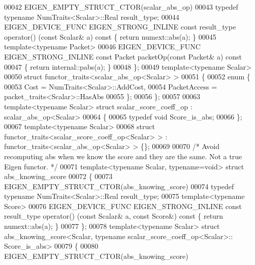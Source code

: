 \begin{DoxyCode}
00042   EIGEN\_EMPTY\_STRUCT\_CTOR(scalar\_abs\_op)
00043   \textcolor{keyword}{typedef} \textcolor{keyword}{typename} NumTraits<Scalar>::Real result\_type;
00044   EIGEN\_DEVICE\_FUNC EIGEN\_STRONG\_INLINE \textcolor{keyword}{const} result\_type operator() (\textcolor{keyword}{const} Scalar& a)\textcolor{keyword}{ const }\{ \textcolor{keywordflow}{return} 
      numext::abs(a); \}
00045   \textcolor{keyword}{template}<\textcolor{keyword}{typename} Packet>
00046   EIGEN\_DEVICE\_FUNC EIGEN\_STRONG\_INLINE \textcolor{keyword}{const} Packet packetOp(\textcolor{keyword}{const} Packet& a)\textcolor{keyword}{ const}
00047 \textcolor{keyword}{  }\{ \textcolor{keywordflow}{return} internal::pabs(a); \}
00048 \};
00049 \textcolor{keyword}{template}<\textcolor{keyword}{typename} Scalar>
00050 \textcolor{keyword}{struct }functor\_traits<scalar\_abs\_op<Scalar> >
00051 \{
00052   \textcolor{keyword}{enum} \{
00053     Cost = NumTraits<Scalar>::AddCost,
00054     PacketAccess = packet\_traits<Scalar>::HasAbs
00055   \};
00056 \};
00057 
00063 \textcolor{keyword}{template}<\textcolor{keyword}{typename} Scalar> \textcolor{keyword}{struct }scalar\_score\_coeff\_op : scalar\_abs\_op<Scalar>
00064 \{
00065   \textcolor{keyword}{typedef} \textcolor{keywordtype}{void} Score\_is\_abs;
00066 \};
00067 \textcolor{keyword}{template}<\textcolor{keyword}{typename} Scalar>
00068 \textcolor{keyword}{struct }functor\_traits<scalar\_score\_coeff\_op<Scalar> > : functor\_traits<scalar\_abs\_op<Scalar> > \{\};
00069 
00070 \textcolor{comment}{/* Avoid recomputing abs when we know the score and they are the same. Not a true Eigen functor.  */}
00071 \textcolor{keyword}{template}<\textcolor{keyword}{typename} Scalar, \textcolor{keyword}{typename}=\textcolor{keywordtype}{void}> \textcolor{keyword}{struct }abs\_knowing\_score
00072 \{
00073   EIGEN\_EMPTY\_STRUCT\_CTOR(abs\_knowing\_score)
00074   \textcolor{keyword}{typedef} \textcolor{keyword}{typename} NumTraits<Scalar>::Real result\_type;
00075   \textcolor{keyword}{template}<\textcolor{keyword}{typename} Score>
00076   EIGEN\_DEVICE\_FUNC EIGEN\_STRONG\_INLINE \textcolor{keyword}{const} result\_type operator() (\textcolor{keyword}{const} Scalar& a, \textcolor{keyword}{const} Score&)\textcolor{keyword}{ const }
      \{ \textcolor{keywordflow}{return} numext::abs(a); \}
00077 \};
00078 \textcolor{keyword}{template}<\textcolor{keyword}{typename} Scalar> \textcolor{keyword}{struct }abs\_knowing\_score<Scalar, typename scalar\_score\_coeff\_op<Scalar>::
      Score\_is\_abs>
00079 \{
00080   EIGEN\_EMPTY\_STRUCT\_CTOR(abs\_knowing\_score)

\end{DoxyCode}
